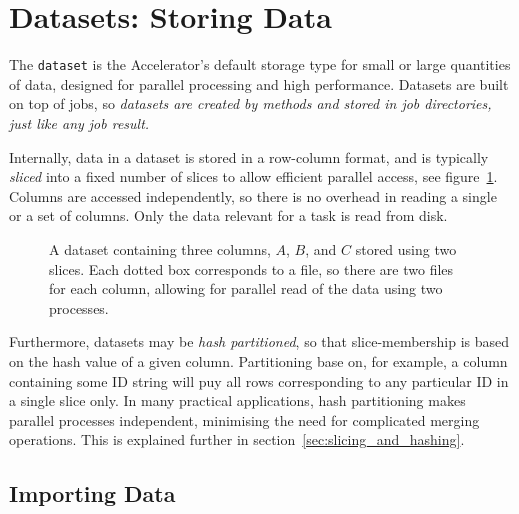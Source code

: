 \section{Datasets: Storing Data}

The \texttt{dataset} is the Accelerator's default storage type for
small or large quantities of data, designed for parallel processing
and high performance.  Datasets are built on top of jobs, so
\emph{datasets are created by methods and stored in job directories,
  just like any job result.}

Internally, data in a dataset is stored in a row-column format, and is
typically \emph{sliced} into a fixed number of slices to allow
efficient parallel access, see figure~\ref{fig:dataset}. Columns are
accessed independently, so there is no overhead in reading a single or
a set of columns.  Only the data relevant for a task is read from
disk.


\begin{figure}[h!]
  \begin{center}
    
    \caption{A dataset containing three columns, $A$, $B$, and $C$
      stored using two slices.  Each dotted box corresponds to a file,
      so there are two files for each column, allowing for parallel
      read of the data using two processes.}
    \label{fig:dataset}
  \end{center}
\end{figure}

Furthermore, datasets may be \textsl{hash partitioned}, so that
slice-membership is based on the hash value of a given column.
Partitioning base on, for example, a column containing some ID string
will puy all rows corresponding to any particular ID in a single slice
only.  In many practical applications, hash partitioning makes
parallel processes independent, minimising the need for complicated
merging operations.  This is explained further in
section~\ref{sec:slicing_and_hashing}.



\subsection{Importing Data}

